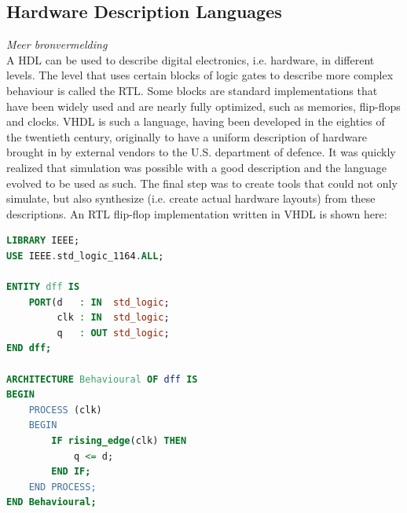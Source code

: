 \documentclass[11pt,british]{article}
\begin{document}
%

\subsection{Hardware Description Languages}
\label{subsec:HDL}
\emph{\color{red}Meer bronvermelding}\\
A \gls{HDL} can be used to describe digital electronics, i.e. hardware, in different levels. The level that uses certain blocks of logic gates to describe more complex behaviour is called the \gls{RTL}. Some blocks are standard implementations that have been widely used and are nearly fully optimized, such as memories, flip-flops and clocks. \gls{VHDL} is such a language, having been developed in the eighties of the twentieth century, originally to have a uniform description of hardware brought in by external vendors to the U.S. department of defence. It was quickly realized that simulation was possible with a good description and the language evolved to be used as such. The final step was to create tools that could not only simulate, but also synthesize (i.e. create actual hardware layouts) from these descriptions. An \gls{RTL} flip-flop implementation written in \gls{VHDL} is shown here: 
\begin{lstlisting}[language=VHDL, tabsize=4, frame=single, framesep=2mm, belowskip=16pt, aboveskip=16pt, showstringspaces=false, basicstyle=\footnotesize]
LIBRARY IEEE;
USE IEEE.std_logic_1164.ALL;

ENTITY dff IS
	PORT(d 	 : IN  std_logic;
		 clk : IN  std_logic;
		 q 	 : OUT std_logic;
END dff;

ARCHITECTURE Behavioural OF dff IS
BEGIN
	PROCESS (clk)
	BEGIN
		IF rising_edge(clk) THEN
			q <= d;
		END IF;
	END PROCESS;
END Behavioural;
\end{lstlisting}
\end{document}
